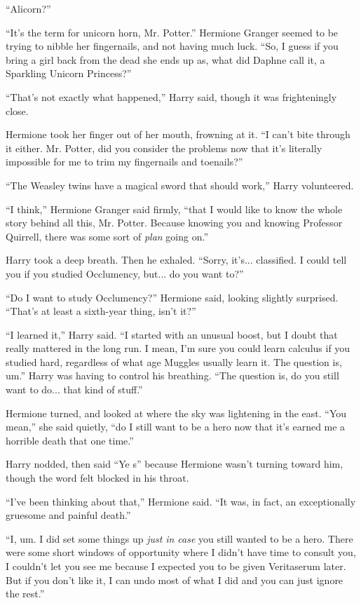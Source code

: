 ``Alicorn?''

``It's the term for unicorn horn, Mr. Potter.'' Hermione Granger seemed to be trying to nibble her fingernails, and not having much luck. ``So, I guess if you bring a girl back from the dead she ends up as, what did Daphne call it, a Sparkling Unicorn Princess?''

``That's not exactly what happened,'' Harry said, though it was frighteningly close.

Hermione took her finger out of her mouth, frowning at it. ``I can't bite through it either. Mr. Potter, did you consider the problems now that it's literally impossible for me to trim my fingernails and toenails?''

``The Weasley twins have a magical sword that should work,'' Harry volunteered.

``I think,'' Hermione Granger said firmly, ``that I would like to know the whole story behind all this, Mr. Potter. Because knowing you and knowing Professor Quirrell, there was some sort of \emph{plan} going on.''

Harry took a deep breath. Then he exhaled. ``Sorry, it's... classified. I could tell you if you studied Occlumency, but... do you want to?''

``Do I want to study Occlumency?'' Hermione said, looking slightly surprised. ``That's at least a sixth-year thing, isn't it?''

``I learned it,'' Harry said. ``I started with an unusual boost, but I doubt that really mattered in the long run. I mean, I'm sure you could learn calculus if you studied hard, regardless of what age Muggles usually learn it. The question is, um.'' Harry was having to control his breathing. ``The question is, do you still want to do... that kind of stuff.''

Hermione turned, and looked at where the sky was lightening in the east. ``You mean,'' she said quietly, ``do I still want to be a hero now that it's earned me a horrible death that one time.''

Harry nodded, then said ``Ye s'' because Hermione wasn't turning toward him, though the word felt blocked in his throat.

``I've been thinking about that,'' Hermione said. ``It was, in fact, an exceptionally gruesome and painful death.''

``I, um. I did set some things up \emph{just} \emph{in case} you still wanted to be a hero. There were some short windows of opportunity where I didn't have time to consult you, I couldn't let you see me because I expected you to be given Veritaserum later. But if you don't like it, I can undo most of what I did and you can just ignore the rest.''

